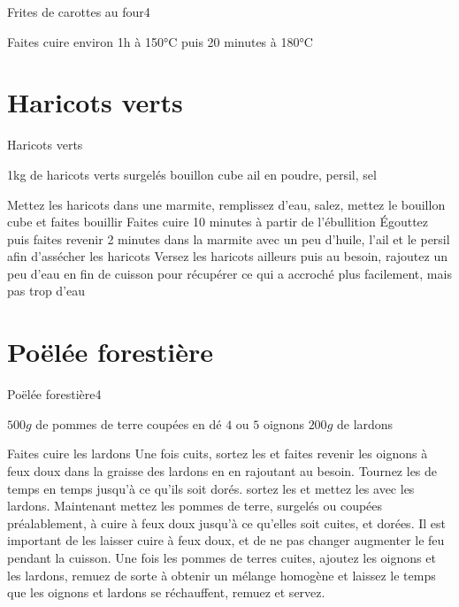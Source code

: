 {\begin{recette}{Frites de carottes au four}{4}{}{}
\begin{cuisson}
Faites cuire environ 1h à 150°C puis 20 minutes à 180°C
\end{cuisson}
\end{recette}

\section{Haricots verts}
\begin{recette}{Haricots verts}{}{}{}
\begin{ingredients}
\ingredient 1kg de haricots verts surgelés
\ingredient bouillon cube
\ingredient ail en poudre, persil, sel
\end{ingredients}

\begin{preparation}
\etape Mettez les haricots dans une marmite, remplissez d'eau, salez, mettez le bouillon cube et faites bouillir
\etape Faites cuire 10 minutes à partir de l'ébullition
\etape Égouttez puis faites revenir 2 minutes dans la marmite avec un peu d'huile, l'ail et le persil afin d'assécher les haricots
\etape Versez les haricots ailleurs puis au besoin, rajoutez un peu d'eau en fin de cuisson pour récupérer ce qui a accroché plus facilement, mais pas trop d'eau
\end{preparation}
\end{recette}

\section{Poëlée forestière}
\begin{recette}{Poëlée forestière}{4}{}{}
\begin{ingredients}
\ingredient $500\unit{g}$ de pommes de terre coupées en dé
\ingredient $4$ ou $5$ oignons
\ingredient $200\unit{g}$ de lardons
\end{ingredients}

\begin{preparation}
\etape Faites cuire les lardons
\etape Une fois cuits, sortez les et faites revenir les oignons à feux doux dans la graisse des lardons en en rajoutant au 
besoin. Tournez les de temps en temps jusqu'à ce qu'ils soit dorés.
\etape sortez les et mettez les avec les lardons. Maintenant mettez les pommes de terre, surgelés ou coupées préalablement, à 
cuire à feux doux jusqu'à ce qu'elles soit cuites, et dorées. Il est important de les laisser cuire à feux doux, et de ne pas 
changer augmenter le feu pendant la cuisson.
\etape Une fois les pommes de terres cuites, ajoutez les oignons et les lardons, remuez de sorte à obtenir un mélange homogène 
et laissez le temps que les oignons et lardons se réchauffent, remuez et servez.
\end{preparation}
\end{recette}

}
